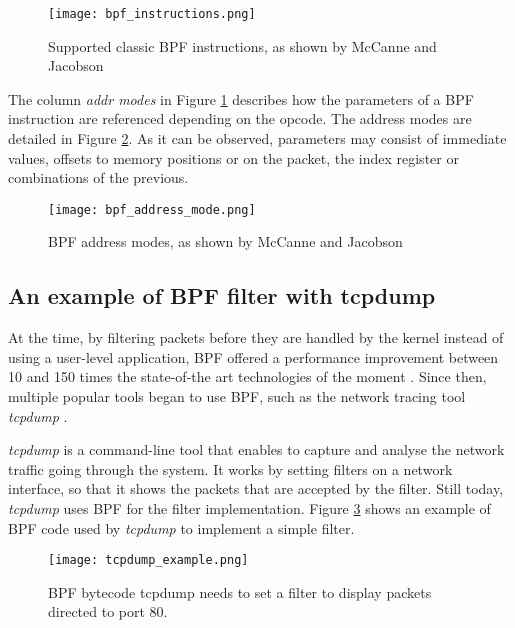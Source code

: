 \begin{figure}[htbp]
	\centering
	\texttt{[image: bpf\_instructions.png]}
	\caption{Supported classic BPF instructions, as shown by McCanne and Jacobson \cite{bpf_bsd_origin_bpf_page7}}
	\label{fig:bpf_instructions}
\end{figure}

The column \textit{addr modes} in Figure \ref{fig:bpf_instructions} describes how the parameters of a BPF instruction are referenced depending on the opcode. The address modes are detailed in Figure \ref{fig:bpf_address_mode}. As it can be observed, parameters may consist of immediate values, offsets to memory positions or on the packet, the index register or combinations of the previous.

\begin{figure}[htbp]
	\centering
	\texttt{[image: bpf\_address\_mode.png]}
	\caption{BPF address modes, as shown by McCanne and Jacobson \cite{bpf_bsd_origin_bpf_page8}}
	\label{fig:bpf_address_mode}
\end{figure}

\subsection{An example of BPF filter with tcpdump} \label{subsection:tcpdump}
At the time, by filtering packets before they are handled by the kernel instead of using a user-level application, BPF offered a performance improvement between 10 and 150 times the state-of-the art technologies of the moment \cite{bpf_bsd_origin_bpf_page1}. Since then, multiple popular tools began to use BPF, such as the network tracing tool \textit{tcpdump} \cite{tcpdump_page}.

\textit{tcpdump} is a command-line tool that enables to capture and analyse the network traffic going through the system. It works by setting filters on a network interface, so that it shows the packets that are accepted by the filter. Still today, \textit{tcpdump} uses BPF for the filter implementation. Figure \ref{fig:bpf_tcpdump_example} shows an example of BPF code used by \textit{tcpdump} to implement a simple filter.

\begin{figure}[htbp]
	\centering
	\texttt{[image: tcpdump\_example.png]}
	\caption{BPF bytecode tcpdump needs to set a filter to display packets directed to port 80.}
	\label{fig:bpf_tcpdump_example}
\end{figure}

